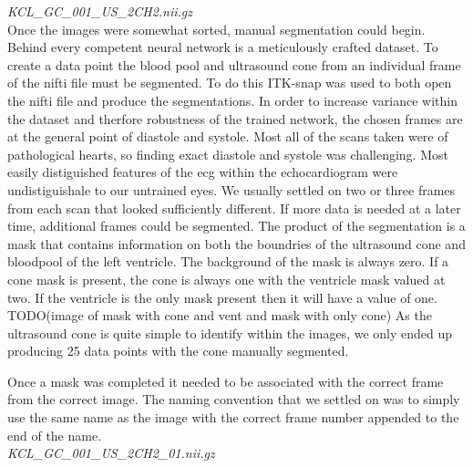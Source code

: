 \documentclass[12pt]{article}
\begin{document}
\textit{KCL\_GC\_001\_US\_2CH2.nii.gz}\\

Once the images were somewhat sorted, manual segmentation could begin. Behind every competent neural network is a meticulously crafted dataset.
To create a data point the blood pool and ultrasound cone from an individual frame of the nifti file must be segmented. To do this ITK-snap was used to both open the nifti file and produce the segmentations.
In order to increase variance within the dataset and therfore robustness of the trained network, the chosen frames are at the general point of diastole and systole.
Most all of the scans taken were of pathological hearts, so finding exact diastole and systole was challenging.
Most easily distiguished features of the ecg within the echocardiogram were undistiguishale to our untrained eyes.
We usually settled on two or three frames from each scan that looked sufficiently different.
If more data is needed at a later time, additional frames could be segmented.
The product of the segmentation is a mask that contains information on both the boundries of the ultrasound cone and bloodpool of the left ventricle.
The background of the mask is always zero. If a cone mask is present, the cone is always one with the ventricle mask valued at two.
If the ventricle is the only mask present then it will have a value of one.
TODO(image of mask with cone and vent and mask with only cone)
As the ultrasound cone is quite simple to identify within the images, we only ended up producing 25 data points with the cone manually segmented.
\par
Once a mask was completed it needed to be associated with the correct frame from the correct image.
The naming convention that we settled on was to simply use the same name as the image with the correct frame number appended to the end of the name.\\

\textit{KCL\_GC\_001\_US\_2CH2\_01.nii.gz}\\
\end{document}
